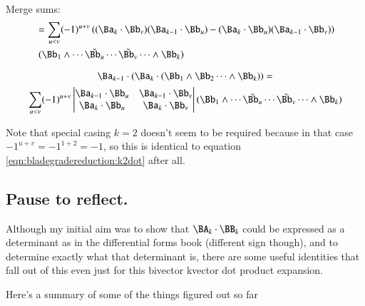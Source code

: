 Merge sums:
\begin{align*}
&= \sum_{u<v} (-1)^{u+v} 
\left(
(\Ba_k \cdot \Bb_v) (\Ba_{k-1} \cdot \Bb_u)
-(\Ba_k \cdot \Bb_u) (\Ba_{k-1} \cdot \Bb_v)
\right) \\
& \; (\Bb_1 \wedge \cdots \check{\Bb_u} \cdots \check{\Bb_v} \cdots \wedge \Bb_k)
\end{align*}

\begin{equation}\label{eqn:bladegradereduction:bivectordotkvector}
\Ba_{k-1} \cdot (\Ba_k \cdot (\Bb_1 \wedge \Bb_2 \cdots \wedge \Bb_k))
= 
\end{equation}
\begin{equation*}
\sum_{u<v} (-1)^{u+v} 
\begin{vmatrix}
\Ba_{k-1} \cdot \Bb_u & \Ba_{k-1} \cdot \Bb_v \\
\Ba_k \cdot \Bb_u & \Ba_k \cdot \Bb_v \\
\end{vmatrix}
(\Bb_1 \wedge \cdots \check{\Bb_u} \cdots \check{\Bb_v} \cdots \wedge \Bb_k) \\
\end{equation*}

Note that special casing $k=2$ doesn't seem to be required because in that
case $-1^{u+v} = -1^{1+2}=-1$, so this is identical to 
equation \ref{eqn:bladegradereduction:k2dot} after all.

\subsection{Pause to reflect. }

Although my initial aim was to show that $\BA_k \cdot \BB_k$ could be
expressed as a determinant as in the differential forms book (different
sign though), and to determine exactly what that determinant is, there
are some useful identities that fall out of this even just for this
bivector kvector dot product expansion.

Here's a summary of some of the things figured out so far

